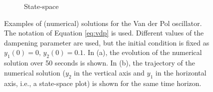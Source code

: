 \begin{figure}[h]
\begin{subfigure}[b]{\textwidth}
	\caption{State-space}\label{fig:vdp_statespace}
    \end{subfigure}
    \caption[Examples of (numerical) solutions for the Van der Pol oscillator.]{Examples of (numerical) solutions for the Van der Pol oscillator. The notation of Equation \eqref{eq:vdp} is used. Different values of the dampening parameter are used, but the initial condition is fixed as $y_1(0)=0,\,y_2(0)=0.1$. In (a), the evolution of the numerical solution over 50 seconds is shown. In (b), the trajectory of the numerical solution ($y_2$ in the vertical axis and $y_1$ in the horizontal axis, i.e., a state-space plot) is shown for the same time horizon.}\label{fig:vdp_example}
\end{figure}

